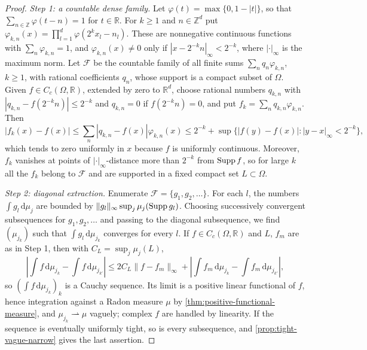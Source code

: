 \begin{proof}
\emph{Step 1: a countable dense family.} Let $\varphi(t)=\max\{0,1-|t|\}$, so that $\sum_{n\in\mathbb Z}\varphi(t-n)=1$ for $t\in\mathbb R$. For $k\geq1$ and $n\in\mathbb Z^d$ put $\varphi_{k,n}(x)=\prod_{l=1}^d\varphi(2^kx_l-n_l)$. These are nonnegative continuous functions with $\sum_n\varphi_{k,n}=1$, and $\varphi_{k,n}(x)\neq0$ only if $|x-2^{-k}n|_\infty<2^{-k}$, where $|\cdot|_\infty$ is the maximum norm. Let $\mathcal F$ be the countable family of all finite sums $\sum_nq_n\varphi_{k,n}$, $k\geq1$, with rational coefficients $q_n$, whose support is a compact subset of $\Omega$. Given $f\in C_c(\Omega,\mathbb R)$, extended by zero to $\mathbb R^d$, choose rational numbers $q_{k,n}$ with $|q_{k,n}-f(2^{-k}n)|\leq2^{-k}$ and $q_{k,n}=0$ if $f(2^{-k}n)=0$, and put $f_k=\sum_nq_{k,n}\varphi_{k,n}$. Then
\[
 |f_k(x)-f(x)|\leq\sum_n|q_{k,n}-f(x)|\varphi_{k,n}(x)\leq2^{-k}+\sup\{|f(y)-f(x)|:|y-x|_\infty<2^{-k}\},
\]
which tends to zero uniformly in $x$ because $f$ is uniformly continuous. Moreover, $f_k$ vanishes at points of $|\cdot|_\infty$-distance more than $2^{-k}$ from $\operatorname{Supp} f$, so for large $k$ all the $f_k$ belong to $\mathcal F$ and are supported in a fixed compact set $L\subset\Omega$.

\emph{Step 2: diagonal extraction.} Enumerate $\mathcal F=\{g_1,g_2,\ldots\}$. For each $l$, the numbers $\int g_l\,\mathrm d\mu_j$ are bounded by $\|g_l\|_\infty\sup_j\mu_j(\operatorname{Supp} g_l)$. Choosing successively convergent subsequences for $g_1,g_2,\ldots$ and passing to the diagonal subsequence, we find $(\mu_{j_k})$ such that $\int g_l\,\mathrm d\mu_{j_k}$ converges for every $l$. If $f\in C_c(\Omega,\mathbb R)$ and $L$, $f_m$ are as in Step 1, then with $C_L=\sup_j\mu_j(L)$,
\[
 \left|\int f\,\mathrm d\mu_{j_k}-\int f\,\mathrm d\mu_{j_{k'}}\right|\leq2C_L\|f-f_m\|_\infty+\left|\int f_m\,\mathrm d\mu_{j_k}-\int f_m\,\mathrm d\mu_{j_{k'}}\right|,
\]
so $(\int f\,\mathrm d\mu_{j_k})_k$ is a Cauchy sequence. Its limit is a positive linear functional of $f$, hence integration against a Radon measure $\mu$ by \cref{thm:positive-functional-measure}, and $\mu_{j_k}\rightharpoonup\mu$ vaguely; complex $f$ are handled by linearity. If the sequence is eventually uniformly tight, so is every subsequence, and \cref{prop:tight-vague-narrow} gives the last assertion.
\end{proof}

